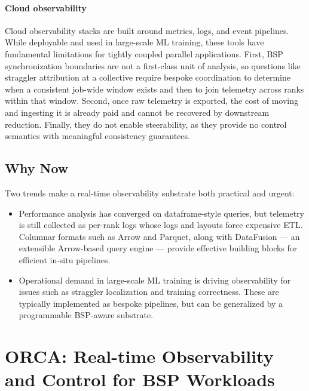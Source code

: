 \paragraph{Cloud observability}
Cloud observability stacks are built around metrics, logs, and event pipelines.
While deployable and used in large-scale ML training, these tools have fundamental limitations for
tightly coupled parallel applications.
First, BSP synchronization boundaries are not a first-class unit of analysis, so questions like
straggler attribution at a collective require bespoke coordination to determine when a consistent
job-wide window exists and then to join telemetry across ranks within that window.
Second, once raw telemetry is exported, the cost of moving and ingesting it is already paid and
cannot be recovered by downstream reduction.
Finally, they do not enable steerability, as they provide no control semantics with meaningful
consistency guarantees.

\subsection{Why Now}

Two trends make a real-time observability substrate both practical and urgent:

\begin{itemize}[leftmargin=*]
  \item Performance analysis has converged on dataframe-style queries, but telemetry is still
        collected as per-rank logs whose logs and layouts force expensive ETL.
        Columnar formats such as Arrow and Parquet, along with DataFusion --- an extensible Arrow-based
        query engine --- provide effective building blocks for efficient in-situ pipelines.

  \item Operational demand in large-scale ML training is driving observability for issues such as
        straggler localization and training correctness.
        These are typically implemented as bespoke pipelines, but can be generalized by a
        programmable BSP-aware substrate.
\end{itemize}




\section{ORCA: Real-time Observability and Control for BSP Workloads}
\label{sec:intro:orca}

